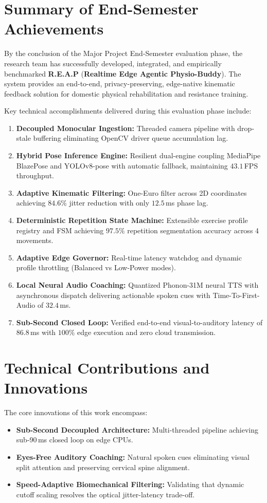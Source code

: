 \documentclass[12pt]{report}
\begin{document}
\section{Summary of End-Semester Achievements}
By the conclusion of the Major Project End-Semester evaluation phase, the research team has successfully developed, integrated, and empirically benchmarked \textbf{R.E.A.P} (\textbf{Realtime Edge Agentic Physio-Buddy}). The system provides an end-to-end, privacy-preserving, edge-native kinematic feedback solution for domestic physical rehabilitation and resistance training.

Key technical accomplishments delivered during this evaluation phase include:
\begin{enumerate}[label={(\arabic*)}, leftmargin=*, itemsep=0pt, topsep=0.1em, parsep=0pt]
    \item \textbf{Decoupled Monocular Ingestion:} Threaded camera pipeline with drop-stale buffering eliminating OpenCV driver queue accumulation lag.
    \item \textbf{Hybrid Pose Inference Engine:} Resilient dual-engine coupling MediaPipe BlazePose and YOLOv8-pose with automatic fallback, maintaining $43.1$\,FPS throughput.
    \item \textbf{Adaptive Kinematic Filtering:} One-Euro filter across 2D coordinates achieving $84.6\%$ jitter reduction with only $12.5$\,ms phase lag.
    \item \textbf{Deterministic Repetition State Machine:} Extensible exercise profile registry and FSM achieving $97.5\%$ repetition segmentation accuracy across 4 movements.
    \item \textbf{Adaptive Edge Governor:} Real-time latency watchdog and dynamic profile throttling (Balanced vs Low-Power modes).
    \item \textbf{Local Neural Audio Coaching:} Quantized Phonon-31M neural TTS with asynchronous dispatch delivering actionable spoken cues with Time-To-First-Audio of $32.4$\,ms.
    \item \textbf{Sub-Second Closed Loop:} Verified end-to-end visual-to-auditory latency of $86.8$\,ms with $100\%$ edge execution and zero cloud transmission.
\end{enumerate}

\section{Technical Contributions and Innovations}
The core innovations of this work encompass:
\begin{itemize}[label={$\bullet$}, leftmargin=*, itemsep=0pt, topsep=0.1em, parsep=0pt]
    \item \textbf{Sub-Second Decoupled Architecture:} Multi-threaded pipeline achieving sub-90\,ms closed loop on edge CPUs.
    \item \textbf{Eyes-Free Auditory Coaching:} Natural spoken cues eliminating visual split attention and preserving cervical spine alignment.
    \item \textbf{Speed-Adaptive Biomechanical Filtering:} Validating that dynamic cutoff scaling resolves the optical jitter-latency trade-off.
\end{itemize}
\end{document}
